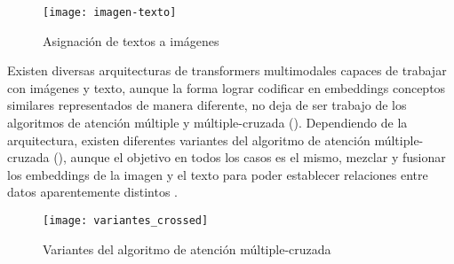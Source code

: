 			\begin{figure}[!h]
				\centering
				\texttt{[image: imagen-texto]}
				\caption{Asignación de textos a imágenes}
				\label{fig:textos_imagenes}
			\end{figure}
			
			Existen diversas arquitecturas de transformers multimodales capaces de trabajar con imágenes y texto, aunque la forma lograr codificar en embeddings conceptos similares representados de manera diferente, no deja de ser trabajo de los algoritmos de atención múltiple y múltiple-cruzada (). Dependiendo de la arquitectura, existen diferentes variantes del algoritmo de atención múltiple-cruzada (), aunque el objetivo en todos los casos es el mismo, mezclar y fusionar los embeddings de la imagen y el texto para poder establecer relaciones entre datos aparentemente distintos \cite{multimodal_transformers}. 
			
			\begin{figure}[!h]
				\centering
				\texttt{[image: variantes\_crossed]}
				\caption{Variantes del algoritmo de atención múltiple-cruzada}
				\label{fig:variantes_crossed}
			\end{figure}